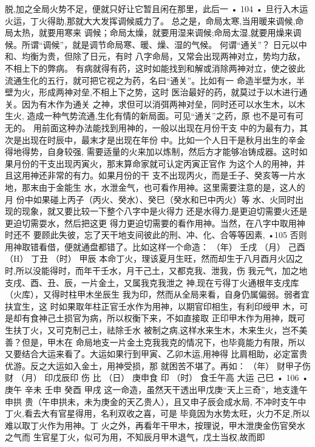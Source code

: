 脱,加之全局火势不足，便就只好让它暂且闲在那里，此后一
• 104 •
旦行入木运火运，丁火得助,那就大大发挥调候威力了。
总之是，命局太寒,当用暖来调候,命局太热，就要用寒来
调候；命局太燥，就要用湿来调候;命局太湿,就要用燥来调
候。所谓“调候”，就是调节命局寒、暖、燥、湿的气候。
何谓“通关”？ 日元以中和、均衡为贵，但除了日元，有时
八字命局，又常会出现两神对立，势均力敌，不相上下的弊病。
有病就得有药，这时如能找到和解或消除两神对立，使之彼此
流通生化的五行，就可把它视之为药，名曰“通关”。比如有一
命造半壁为水，半壁为火，形成两神对垒,不相上下之势，这时
医治最好的药，就莫过于以木进行通关。因为有木作为通关
之神，求但可以消弭两神对垒，同时还可以水生木，以木生火,
造成一种气势流通,生化有情的新局面。可见“通关”之药，原
也不是可有可无的。
用前面这种办法能找到用神的，一般以出现在月份干支
中的为最有力，其次是出现在时辰中，最末才是出现在年份
中。比如一个人日干是秋月出生的辛金得地得势，自身较强,
需要适量的火来加以炼制，然后方才能够冶铸成器。这时如
果月份的干支出现丙寅火，那末算命家就可认定丙寅正官作
为这个人的用神，并且这用神还非常的有力。如果月份的干
支不出现丙火，而是壬子、癸亥等一片水地，那末由于金能生
水，水泄金气，也可看作用神。这里需要注意的是，这人的月
份中如果碰上丙子（丙火、癸水）、癸巳（癸水和巳中丙火）等
水、火同时出现的现象，就又要比较一下整个八字中是火得力
还是水得力,是更迫切需要火还是更迫切需耍水，然后把这更
得力更迫切需要的看作用神。当然，在八字中取用神时还不
要顾此失彼，忘了天干地支间彼此的刑、冲、化、合等等因素,
•105
否则用神取错看借，便就通盘都错了。比如这样一个命造：
（年） 壬戌
（月） 己酉
（H） 丁丑
（时） 甲辰
本命丁火，理该夏月生旺，然而却生于八月酉月火囚之
时,所以没能得时，而年干壬水，月干己土，又都克我、泄我，伤
我元气，加之地支戌、酉、丑、辰，一片金土，又属我克我泄之
神,现在亏得丁火通根年支戌库（火库），又得时柱甲木坐辰生
我为印，然而从全局来看，自身仍属偏弱。弱者宜扶宜生，这
时如果取年柱正官壬水作为用神，以期官印相生，有利印绶甲
木，可是却有食神己土损官为病，所以权衡下来，不如直接取
正印甲木作为用神，既可生扶丁火，又可克制己土，祛除壬水
被制之病,这样水来生木，木来生火，岂不美善？但是，甲木在
命局地支一片金土克我我克的情况下，也毕竟能力有限，所以
又要结合大运来看了。大运如果行到甲寅、乙卯木运,用神得
比肩相助，必定富贵优游。反之大运如入金土，用神受损，那
就困苦不堪了。再如：
（年） 财甲子伤
财
（月） 印戊辰印
伤
比
（日） 庚申食
印
（时） 食壬午高
大运 己巳
• 106 •
庚午
辛未
壬申
癸酉
甲戌
这一命造，虽然天干透出甲戊庚“天上三奇”，地支逢午申拱
贵（午申拱未，未为庚金的天乙贵人），且又申子辰会成水局,
不冲时支午中丁火,看去大有官星得用，名利双收之喜，可是
毕竟因为水势太旺，火力不足,所以难以取丁火作为用神。丁
火之外，再看年干甲木，按理说，甲木泄庚金伤官癸水之气而
生官星丁火，似可为用，不知辰月甲木退气，戊土当权,故而即
